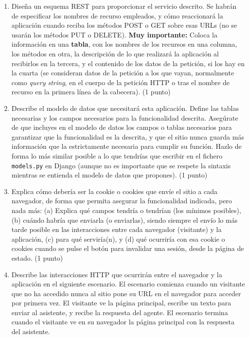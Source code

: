 \begin{enumerate}
\item Diseña un esquema REST para proporcionar el servicio descrito. Se habrán de especificar los nombres de recurso empleados, y cómo reaccionará la aplicación cuando reciba los métodos POST o GET sobre esas URLs (no se usarán los métodos PUT o DELETE). \textbf{Muy importante:} Coloca la información en una \textbf{tabla}, con los nombres de los recursos en una columna, los métodos en otra, la descripción de lo que realizará la aplicación al recibirlos en la tercera, y el contenido de los datos de la petición, si los hay en la cuarta (se consideran datos de la petición a los que vayan, normalmente como \emph{query string}, en el cuerpo de la petición HTTP o tras el nombre de recurso en la primera línea de la cabecera). (1 punto)

\item Describe el modelo de datos que necesitará esta aplicación. Define las tablas necesarias y los campos necesarios para la funcionalidad descrita. Asegúrate de que incluyes en el modelo de datos los campos o tablas necesarios para garantizar que la funcionalidad es la descrita, y que el sitio nunca guarda más información que la estrictamente necesaria para cumplir su función. Hazlo de forma lo más similar posible a lo que tendrías que escribir en el fichero \texttt{models.py} en Django (aunque no es importante que se respete la sintaxis mientras se entienda el modelo de datos que propones). (1 punto)

\item Explica cómo debería ser la cookie o cookies que envíe el sitio a cada navegador, de forma que permita asegurar la funcionalidad indicada, pero nada más: (a) Explica qué campos tendría o tendrían (los mínimos posibles), (b) cuándo habría que enviarla (o enviarlas), siendo siempre el envío lo más tarde posible en las interacciones entre cada navegador (visitante) y la aplicación, (c) para qué serviría(n), y (d) qué ocurriría con esa cookie o cookies cuando se pulse el botón para invalidar una sesión, desde la página de estado. (1 punto)
  
\item Describe las interacciones HTTP que ocurrirán entre el navegador y la aplicación en el siguiente escenario. El escenario comienza cuando un visitante que no ha accedido nunca al sitio pone su URL en el navegador para acceder por primera vez. El visitante ve la página principal, escribe un texto para enviar al asistente, y recibe la respuesta del agente. El escenario termina cuando el visitante ve en su navegador la página principal con la respuesta del asistente.


\end{enumerate}

